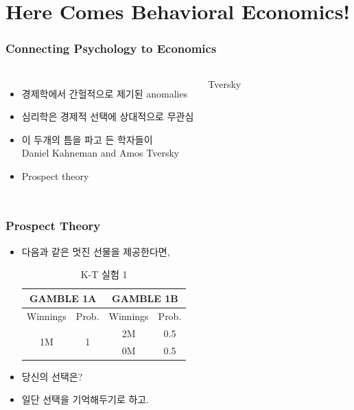 \documentclass[final]{beamer}
\begin{document}
\section{Here Comes Behavioral Economics!}
%
\begin{frame}\frametitle{Connecting Psychology to Economics}\vspace{3em}
\begin{columns}[c]
%
\column{18em}
\begin{itemize}
	\item 경제학에서 간헐적으로 제기된 anomalies 
	\item 심리학은 경제적 선택에 상대적으로 무관심 
	\item 이 두개의 틈을 파고 든 학자들이\\
	Daniel Kahneman and Amos Tversky
	\item Prospect theory
\end{itemize}
%
\column{12em}
Tversky
\end{columns}
\end{frame}
%
\begin{frame}\frametitle{Prospect Theory}\vspace{1.5em}
%
\begin{itemize}
\item 다음과 같은 멋진 선물을 제공한다면,
\begin{table} 
\setlength{\tabcolsep}{1.2em}
\begin{tabular}{|c|c||c|c|} \hline
\multicolumn{2}{|c||}{GAMBLE 1A}&\multicolumn{2}{c|}{GAMBLE 1B} \\ \hline
Winnings & Prob. & Winnings & Prob. \\ \hline
\multirow{2}[2]{*}{1M} & \multirow{2}[2]{*}{1} & 2M & 0.5 \\ \cline{3-4}
& & 0M & 0.5 \\  \hline
\end{tabular}
\caption{K-T 실험 1}\label{tab:03}
\end{table}
%
\item 당신의 선택은? 
\item 일단 선택을 기억해두기로 하고. 
\end{itemize}
%
\end{frame}
\end{document}
